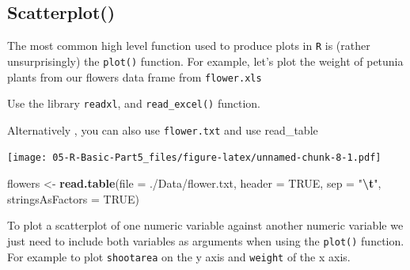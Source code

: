 \documentclass[
]{book}
\newenvironment{Shaded}{\begin{snugshade}}{\end{snugshade}}
\newcommand{\AttributeTok}[1]{\textcolor[rgb]{0.13,0.29,0.53}{#1}}
\newcommand{\ConstantTok}[1]{\textcolor[rgb]{0.56,0.35,0.01}{#1}}
\newcommand{\FunctionTok}[1]{\textcolor[rgb]{0.13,0.29,0.53}{\textbf{#1}}}
\newcommand{\NormalTok}[1]{#1}
\newcommand{\OtherTok}[1]{\textcolor[rgb]{0.56,0.35,0.01}{#1}}
\newcommand{\SpecialCharTok}[1]{\textcolor[rgb]{0.81,0.36,0.00}{\textbf{#1}}}
\newcommand{\StringTok}[1]{\textcolor[rgb]{0.31,0.60,0.02}{#1}}
\begin{document}
\subsection*{Scatterplot()}\label{scatterplot}

The most common high level function used to produce plots in \texttt{R} is (rather unsurprisingly) the \texttt{plot()} function. For example, let's plot the weight of petunia plants from our flowers data frame from \texttt{flower.xls}

Use the library \texttt{readxl}, and \texttt{read\_excel()} function.

Alternatively , you can also use \texttt{flower.txt} and use read\_table

\begin{Shaded}
\end{Shaded}

\texttt{[image: 05-R-Basic-Part5\_files/figure-latex/unnamed-chunk-8-1.pdf]}

\begin{Shaded}
\begin{Highlighting}[]
\NormalTok{flowers }\OtherTok{\textless{}{-}} \FunctionTok{read.table}\NormalTok{(}\AttributeTok{file =} \StringTok{\textquotesingle{}./Data/flower.txt\textquotesingle{}}\NormalTok{, }
                        \AttributeTok{header =} \ConstantTok{TRUE}\NormalTok{, }\AttributeTok{sep =} \StringTok{"}\SpecialCharTok{\textbackslash{}t}\StringTok{"}\NormalTok{, }
                        \AttributeTok{stringsAsFactors =} \ConstantTok{TRUE}\NormalTok{)}
\end{Highlighting}
\end{Shaded}

To plot a scatterplot of one numeric variable against another numeric variable we just need to include both variables as arguments when using the \texttt{plot()} function. For example to plot \texttt{shootarea} on the y axis and \texttt{weight} of the x axis.

\begin{Shaded}
\end{Shaded}
\end{document}
